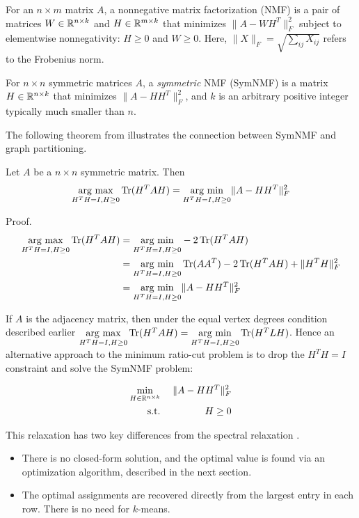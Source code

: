 For an $n \times m$ matrix $A$, a nonnegative matrix factorization
(NMF) is a pair of matrices $W \in \mathbb{R}^{n \times k}$ and
$H \in \mathbb{R}^{m \times k}$ that minimizes $\| A - W H^T \|_F^2$
subject to elementwise nonnegativity: $H \geq 0$ and $W \geq 0$.
Here, $\|X\|_F = \sqrt{\sum_{ij} X_{ij}}$ refers to the Frobenius norm.

For $n \times n$ symmetric matrices $A$, a \textit{symmetric} NMF
(SymNMF) is a matrix $H \in \mathbb{R}^{n \times k}$ that minimizes
$\| A - H H^T \|_F^2$, and $k$ is an arbitrary positive integer
typically much smaller than $n$.

The following theorem from \cite{Ding:05} illustrates the connection
between SymNMF and graph partitioning.

\begin{theorem}
Let $A$ be a $n \times n$ symmetric matrix. Then
\[ \underset{H^T H = I, H \geq 0}{\text{arg max}} \operatorname{Tr}(H^T A H)
 = \underset{H^T H = I, H \geq 0}{\text{arg min}} \| A - H H^T \|_F^2 \]

Proof. \begin{align*}
   \underset{H^T H = I, H \geq 0}{\text{arg max}} \operatorname{Tr}(H^T A H)
&= \underset{H^T H = I, H \geq 0}{\text{arg min}} -2 \operatorname{Tr}(H^T A H) \\
&= \underset{H^T H = I, H \geq 0}{\text{arg min}} \operatorname{Tr}(A A^T) - 2 \operatorname{Tr}(H^T A H)
                                + \|H^T H\|_F^2 \\
&= \underset{H^T H = I, H \geq 0}{\text{arg min}} \|A - H H^T\|_F^2
\end{align*}
\end{theorem}

If $A$ is the adjacency matrix, then under the equal vertex degrees
condition described earlier
$ \underset{H^T H = I, H \geq 0}{\text{arg max}} \operatorname{Tr}(H^T A H)
= \underset{H^T H = I, H \geq 0}{\text{arg min}} \operatorname{Tr}(H^T L H)$.
Hence an alternative approach to the minimum ratio-cut problem
is to drop the $H^T H = I$ constraint and solve the SymNMF problem:

\begin{equation} \label{sym_nmf}
\begin{aligned}
\min_{H \in \mathbb{R}^{n \times k}} &\;& \|A - H H^T\|_F^2 \\
\text{s.t.}                  &\;& H \geq 0          \\
\end{aligned}
\end{equation}

This relaxation has two key differences from the spectral relaxation
\label{spectral_k-partition}.
\begin{itemize}
\item
There is no closed-form solution, and the optimal value is found
via an optimization algorithm, described in the next section.

\item
The optimal assignments are recovered directly from the largest
entry in each row. There is no need for $k$-means.
\end{itemize}


